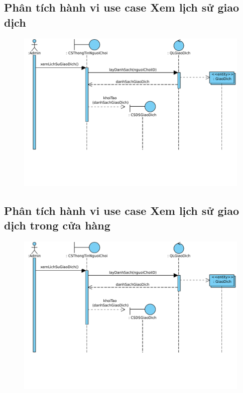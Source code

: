 \documentclass[3p]{elsarticle}
\begin{document}
\subsection{Phân tích hành vi use case Xem lịch sử giao dịch}
\begin{figure}[!htbp]
	\hspace*{-.5in}
	\centering
	\includegraphics[scale=.55]{images/sequence-pdfs/admin/viewPlayerTransactionHistory.pdf}
\end{figure}
\newpage

\subsection{Phân tích hành vi use case Xem lịch sử giao dịch trong cửa hàng}
\begin{figure}[!htbp]
	\hspace*{-.5in}
	\centering
	\includegraphics[scale=.55]{images/sequence-pdfs/admin/viewPlayerTransactionHistory.pdf}
\end{figure}
\newpage
\end{document}
